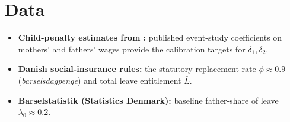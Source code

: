\section*{Data}

\begin{itemize}
    \item \textbf{Child-penalty estimates from \citet{kleven2019children}:} published event-study coefficients on mothers' and fathers' wages provide the calibration targets for $\delta_1, \delta_2$.
    \item \textbf{Danish social-insurance rules:} the statutory replacement rate $\phi \approx 0.9$ (\emph{barselsdagpenge}) and total leave entitlement $\bar{L}$.
    \item \textbf{Barselstatistik (Statistics Denmark):} baseline father-share of leave $\lambda_0 \approx 0.2$.
\end{itemize}
